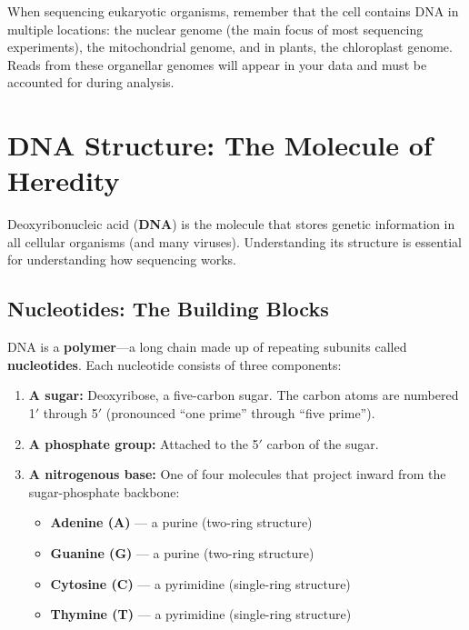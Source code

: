 \begin{tipbox}
When sequencing eukaryotic organisms, remember that the cell contains DNA in multiple locations: the nuclear genome (the main focus of most sequencing experiments), the mitochondrial genome, and in plants, the chloroplast genome. Reads from these organellar genomes will appear in your data and must be accounted for during analysis.
\end{tipbox}


\section{DNA Structure: The Molecule of Heredity}
\label{sec:molbio:dna-structure}

Deoxyribonucleic acid (\textbf{DNA}) is the molecule that stores genetic information in all cellular organisms (and many viruses). Understanding its structure is essential for understanding how sequencing works.

\subsection{Nucleotides: The Building Blocks}
\label{subsec:molbio:nucleotides}

DNA is a \textbf{polymer}---a long chain made up of repeating subunits called \textbf{nucleotides}. Each nucleotide consists of three components:

\begin{enumerate}[itemsep=2pt]
  \item \textbf{A sugar:} Deoxyribose, a five-carbon sugar. The carbon atoms are numbered 1$'${} through 5$'${} (pronounced ``one prime'' through ``five prime'').
  \item \textbf{A phosphate group:} Attached to the 5$'${} carbon of the sugar.
  \item \textbf{A nitrogenous base:} One of four molecules that project inward from the sugar-phosphate backbone:
  \begin{itemize}
    \item \textbf{Adenine (A)} --- a purine (two-ring structure)
    \item \textbf{Guanine (G)} --- a purine (two-ring structure)
    \item \textbf{Cytosine (C)} --- a pyrimidine (single-ring structure)
    \item \textbf{Thymine (T)} --- a pyrimidine (single-ring structure)
  \end{itemize}
\end{enumerate}

